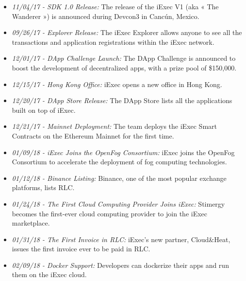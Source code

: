 \begin{itemize}
    \item\textit{11/04/17 - SDK 1.0 Release: }
    The release of the iExec V1 (aka « The Wanderer ») is announced during Devcon3 in Cancún, Mexico.

    \item\textit{09/26/17 - Explorer Release: }
    The iExec Explorer allows anyone to see all the transactions and application registrations within the iExec network.

    \item\textit{12/01/17 - DApp Challenge Launch: }
    The DApp Challenge is announced to boost the development of decentralized apps, with a prize pool of \$150,000.

    \item\textit{12/15/17 - Hong Kong Office: }
    iExec opens a new office in Hong Kong.

    \item\textit{12/20/17 - DApp Store Release: }
    The DApp Store lists all the applications built on top of iExec.

    \item\textit{12/21/17 - Mainnet Deployment: }
    The team deploys the iExec Smart Contracts on the Ethereum Mainnet for the first time.

    \item\textit{01/09/18 - iExec Joins the OpenFog Consortium: }
    iExec joins the OpenFog Consortium to accelerate the deployment of fog computing technologies.

    \item\textit{01/12/18 - Binance Listing: }
    Binance, one of the most popular exchange platforms, lists RLC.

    \item\textit{01/24/18 - The First Cloud Computing Provider Joins iExec: }
    Stimergy becomes the first-ever cloud computing provider to join the iExec marketplace.

    \item\textit{01/31/18 - The First Invoice in RLC: }
    iExec’s new partner, Cloud\&Heat, issues the first invoice ever to be paid in RLC.

    \item\textit{02/09/18 - Docker Support: }
    Developers can dockerize their apps and run them on the iExec cloud.



\end{itemize}
